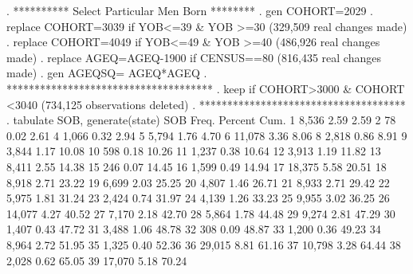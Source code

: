 . **********  Select Particular Men Born ********
. gen COHORT=2029
{\smallskip}
. replace COHORT=3039 if YOB<=39 \& YOB >=30
(329,509 real changes made)
{\smallskip}
. replace COHORT=4049 if YOB<=49 \& YOB >=40
(486,926 real changes made)
{\smallskip}
. replace AGEQ=AGEQ-1900 if CENSUS==80
(816,435 real changes made)
{\smallskip}
. gen AGEQSQ= AGEQ*AGEQ
{\smallskip}
. *************************************
. keep if COHORT>3000 \& COHORT <3040
(734,125 observations deleted)
{\smallskip}
. *************************************
. tabulate SOB, generate(state)
{\smallskip}
        SOB {\VBAR}      Freq.     Percent        Cum.
          1 {\VBAR}      8,536        2.59        2.59
          2 {\VBAR}         78        0.02        2.61
          4 {\VBAR}      1,066        0.32        2.94
          5 {\VBAR}      5,794        1.76        4.70
          6 {\VBAR}     11,078        3.36        8.06
          8 {\VBAR}      2,818        0.86        8.91
          9 {\VBAR}      3,844        1.17       10.08
         10 {\VBAR}        598        0.18       10.26
         11 {\VBAR}      1,237        0.38       10.64
         12 {\VBAR}      3,913        1.19       11.82
         13 {\VBAR}      8,411        2.55       14.38
         15 {\VBAR}        246        0.07       14.45
         16 {\VBAR}      1,599        0.49       14.94
         17 {\VBAR}     18,375        5.58       20.51
         18 {\VBAR}      8,918        2.71       23.22
         19 {\VBAR}      6,699        2.03       25.25
         20 {\VBAR}      4,807        1.46       26.71
         21 {\VBAR}      8,933        2.71       29.42
         22 {\VBAR}      5,975        1.81       31.24
         23 {\VBAR}      2,424        0.74       31.97
         24 {\VBAR}      4,139        1.26       33.23
         25 {\VBAR}      9,955        3.02       36.25
         26 {\VBAR}     14,077        4.27       40.52
         27 {\VBAR}      7,170        2.18       42.70
         28 {\VBAR}      5,864        1.78       44.48
         29 {\VBAR}      9,274        2.81       47.29
         30 {\VBAR}      1,407        0.43       47.72
         31 {\VBAR}      3,488        1.06       48.78
         32 {\VBAR}        308        0.09       48.87
         33 {\VBAR}      1,200        0.36       49.23
         34 {\VBAR}      8,964        2.72       51.95
         35 {\VBAR}      1,325        0.40       52.36
         36 {\VBAR}     29,015        8.81       61.16
         37 {\VBAR}     10,798        3.28       64.44
         38 {\VBAR}      2,028        0.62       65.05
         39 {\VBAR}     17,070        5.18       70.24
